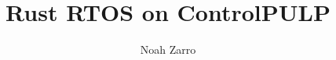 \documentclass[]{iisreport}
\title{Rust RTOS on ControlPULP}
\author{Noah Zarro}
\begin{document}
\frontmatter





\tableofcontents

\mainmatter







\appendix



\backmatter


\listofacronyms

\listoffigures
\listoftables


\end{document}
